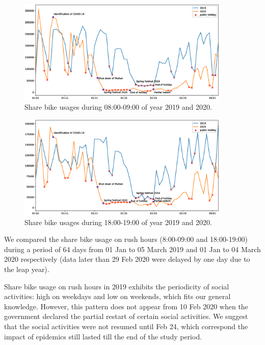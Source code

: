 \documentclass[preprints,ijgi,submit,moreauthors]{Definitions/mdpi}
\begin{document}
\begin{figure}[H]
    \centering
    \includegraphics[width=0.9\textwidth]{Figures/hour_8.eps}
    \caption{Share bike usages during 08:00-09:00 of year 2019 and 2020.}
    \label{fig:hour_comparison_8}
\end{figure}

\begin{figure}[H]
    \centering
    \includegraphics[width=0.9\textwidth]{Figures/hour_18.eps}
    \caption{Share bike usages during 18:00-19:00 of year 2019 and 2020.}
    \label{fig:hour_comparison_18}
\end{figure}

We compared the share bike usage on rush hours (8:00-09:00 and 18:00-19:00) during a period of 64 days from 01 Jan to 05 March 2019 and 01 Jan to 04 March 2020 respectively (data later than 29 Feb 2020 were delayed by one day due to the leap year).

Share bike usage on rush hours in 2019 exhibits the periodicity of social activities: high on weekdays and low on weekends, which fits our general knowledge.
However, this pattern does not appear from 10 Feb 2020 when the government declared the partial restart of certain social activities.
We suggest that the social activities were not resumed until Feb 24, which correspond the impact of epidemics still lasted till the end of the study period.
\end{document}
